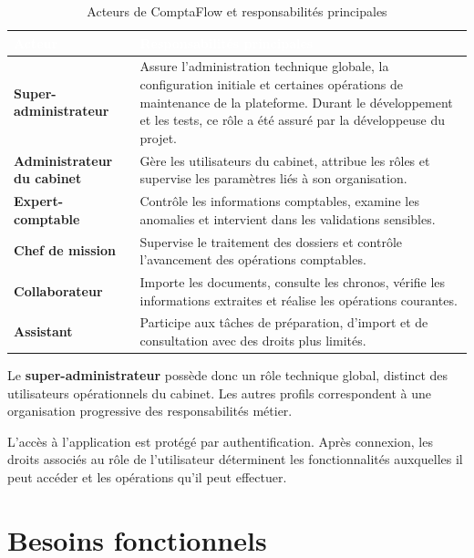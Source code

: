 \documentclass[12pt,a4paper,oneside]{report}
\newcommand{\TableSetup}{%
  \arrayrulecolor{ComptaTableLine}%
  \setlength{\arrayrulewidth}{0.45pt}%
  \renewcommand{\arraystretch}{1.18}%
}
\newcommand{\TableHead}[1]{\textcolor{white}{\textbf{#1}}}
\begin{document}
\begin{table}[H]
\centering
\caption{Acteurs de ComptaFlow et responsabilités principales}
\label{tab:acteurs-comptaflow}
\TableSetup
\begin{tabularx}{\textwidth}{|L{4.2cm}|Y|}
\toprule
{}\TableHead{Acteur} & \TableHead{Responsabilités principales} \\
\midrule
\textbf{Super-administrateur} & Assure l'administration technique globale, la configuration initiale et certaines opérations de maintenance de la plateforme. Durant le développement et les tests, ce rôle a été assuré par la développeuse du projet. \\
\textbf{Administrateur du cabinet} & Gère les utilisateurs du cabinet, attribue les rôles et supervise les paramètres liés à son organisation. \\
\textbf{Expert-comptable} & Contrôle les informations comptables, examine les anomalies et intervient dans les validations sensibles. \\
\textbf{Chef de mission} & Supervise le traitement des dossiers et contrôle l'avancement des opérations comptables. \\
\textbf{Collaborateur} & Importe les documents, consulte les chronos, vérifie les informations extraites et réalise les opérations courantes. \\
\textbf{Assistant} & Participe aux tâches de préparation, d'import et de consultation avec des droits plus limités. \\
\bottomrule
\end{tabularx}
\end{table}

Le \textbf{super-administrateur} possède donc un rôle technique global, distinct des utilisateurs opérationnels du cabinet. Les autres profils correspondent à une organisation progressive des responsabilités métier.

L'accès à l'application est protégé par authentification. Après connexion, les droits associés au rôle de l'utilisateur déterminent les fonctionnalités auxquelles il peut accéder et les opérations qu'il peut effectuer.

\section{Besoins fonctionnels}
\end{document}
